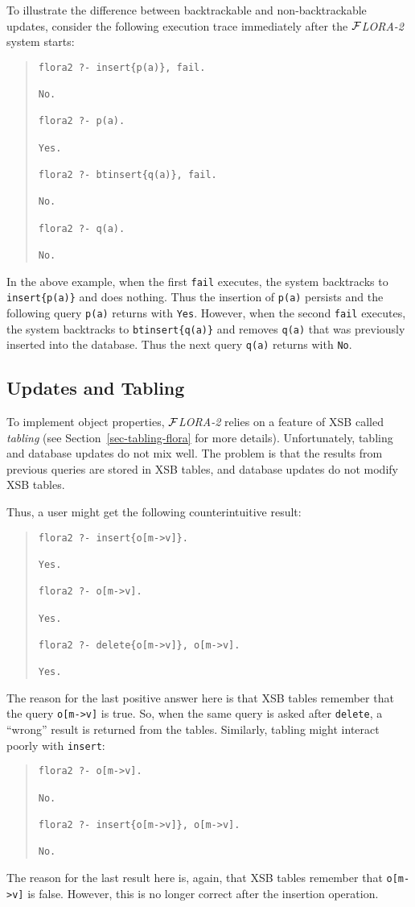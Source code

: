 \documentclass[11pt]{article}
\newcommand{\FLORA}{{\mbox{${\cal F}${\small\it LORA}\rm\emph{-2}}}\xspace}
\begin{document}
To illustrate the difference between backtrackable and
non-backtrackable updates, consider the following execution trace
immediately after the \FLORA system starts:
\begin{quote}
\begin{verbatim}
flora2 ?- insert{p(a)}, fail.

No.

flora2 ?- p(a).

Yes.

flora2 ?- btinsert{q(a)}, fail.

No.

flora2 ?- q(a).

No.
\end{verbatim}
\end{quote}
In the above example, when the first \verb|fail| executes, the system
backtracks to {\tt insert\{p(a)\}} and does nothing. Thus the insertion
of {\tt p(a)} persists and the following query \verb|p(a)| returns
with {\tt Yes}. However, when the second \verb|fail| executes, the
system backtracks to {\tt btinsert\{q(a)\}} and removes {\tt q(a)} that
was previously inserted into the database. Thus the next query
\verb|q(a)| returns with {\tt No}.


\subsection{Updates and Tabling}


To implement object properties, \FLORA relies on a feature of XSB called
\emph{tabling} (see Section~\ref{sec-tabling-flora} for more details).
Unfortunately, tabling and database updates do not mix well.
The problem is that the results from previous queries are stored in
XSB tables, and database updates do not modify XSB tables.

Thus, a user might get the following counterintuitive result:
\begin{quote}
\begin{verbatim}
flora2 ?- insert{o[m->v]}.

Yes.

flora2 ?- o[m->v].

Yes.

flora2 ?- delete{o[m->v]}, o[m->v].

Yes.
\end{verbatim}
\end{quote}
The reason for the last positive answer here is that XSB tables remember
that the query {\tt o[m->v]} is true. So, when the same query is asked
after {\tt delete}, a ``wrong'' result is returned from the tables. Similarly,
tabling might interact poorly with {\tt insert}:
\begin{quote}
\begin{verbatim}
flora2 ?- o[m->v].

No.

flora2 ?- insert{o[m->v]}, o[m->v].

No.
\end{verbatim}
\end{quote}
The reason for the last result here is, again, that XSB tables
remember that {\tt o[m->v]} is false. However, this is no longer
correct after the insertion operation.
\end{document}
